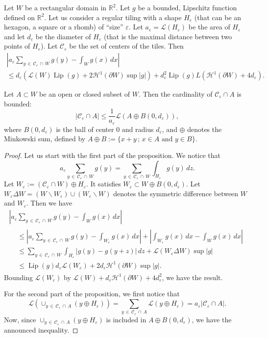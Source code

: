 \documentclass[10pt]{amsart}
\theoremstyle{definition}\newtheorem{defi}[theo]{Definition}\newtheorem{rema}[theo]{Remark}\newtheorem{exam}[theo]{Example}\newtheorem{exem}[theo]{Example}\newtheorem{nota}[theo]{Notation}
\newcommand{\R}{\mathbb{R}}
\newcommand{\eps}{\varepsilon}
\DeclareMathOperator{\Lip}{Lip}
\newcommand{\calH}{\mathcal{H}}
\newcommand{\calL}{\mathcal{L}}
\newcommand{\calC}{\mathcal{C}}
\begin{document}
\begin{prop}\label{approx:prop}
Let $W$ be a rectangular domain in $\R^2$. Let $g$ be a bounded, Lipschitz function defined on $\R^2$. Let us consider a regular tiling with a shape $H_\eps$ (that can be an hexagon, a square or a rhomb) of ``size'' $\eps$. Let $a_\eps=\calL(H_\eps)$ be the area of $H_\eps$ and let $d_\eps$ be the diameter of $H_\eps$ (that is the maximal distance between two points of $H_\eps$). Let $\calC_\eps$ be the set of centers of the tiles. Then
\begin{multline*}
\left| a_\eps \sum_{y\,\in\,\calC_\eps \,\cap\,W } g(y) - \int_W g(x) \, dx
\right|
\\
\leq d_\eps \left(\calL(W) \Lip(g) + 2 \calH^1(\partial W)
\sup |g|\right) + d_\eps^2 \Lip(g) L\left(\calH^1(\partial W) + 4 d_\eps\right).
\end{multline*}

Let $A\subset W$ be an open or closed subset of $W$. Then the cardinality of $\calC_\eps \cap A$ is bounded:
\[
\left| \calC_\eps \cap A \right| \leq \frac{1}{a_\eps} \calL \left(A
\oplus B(0,d_\eps)\right),
\]
where $B(0,d_\eps)$ is the ball of center $0$ and radius $d_\eps$, and $\oplus$ denotes the Minkowski sum, defined by $A\oplus B := \{x+y \, ; \, x\in A \text{ and } y\in B\}$.
\end{prop}

\begin{proof}
Let us start with the first part of the proposition. We notice that
\[
a_\eps \sum_{y\,\in\,\calC_\eps\,\cap\,W } g(y) = \sum_{y\,\in\,\calC_\eps\,
\cap\,W } \int_{H_\eps} g(y) \, dz.
\]
Let $W_\eps :=(\calC_\eps \cap W) \oplus H_\eps$. It satisfies $W_\eps \subset W\oplus B(0,d_\eps)$. Let $W_\eps\Delta W =(W\backslash W_\eps)\cup (W_\eps\backslash W)$ denotes the symmetric difference between $W$ and $W_\eps$. 
Then we have
\begin{multline*}
\left| a_\eps \sum_{y\,\in\,\calC_\eps \,\cap\,W } g(y) - \int_W g(x) \, dx
\right|\\
\begin{aligned}
& \leq \left| a_\eps \sum_{y\,\in\,\calC_\eps\,\cap\,W } g(y) - \int_{W_\eps} g(x) \, dx
\right| + \left| \int_{W_\eps} g(x) \, dx - \int_W g(x) \, dx
\right| \\
& \leq \sum_{y\,\in\,\calC_\eps\,\cap\,W} \int_{H_\eps} |g(y) - g(y+z)| \, dz + \calL \left(W_\eps\Delta W\right) \sup |g| \\
& \leq \Lip(g) d_\eps \calL (W_\eps) + 2 d_\eps
\calH^1(\partial W) \sup |g|.
\end{aligned}
\end{multline*}
Bounding $\calL(W_\eps)$ by $\calL(W) + d_\eps
\calH^1(\partial W) + 4 d_\eps^2$, we have the result.


For the second part of the proposition, we first notice that
\[
\calL \left(\cup_{y\,\in\,\calC_\eps\,\cap\,A} (y \oplus H_\eps)\right) =
\sum_{y\,\in\,\calC_\eps\,\cap\,A} \calL(y \oplus H_\eps) = a_\eps \left|
\calC_\eps \cap A \right|.
\]
Now, since $\cup_{y\,\in\,\calC_\eps\,\cap\,A} (y \oplus H_\eps)$ is included in $A \oplus B(0,d_\eps)$, we have the announced inequality.
\end{proof}
\end{document}

